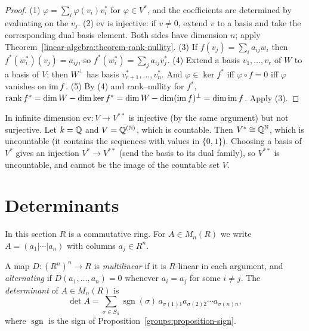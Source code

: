 \begin{proof}
(1) $\varphi = \sum_i \varphi(v_i)v_i^*$ for $\varphi \in V^*$, and the coefficients are determined by evaluating on
the $v_j$.
(2) $\mathrm{ev}$ is injective: if $v \neq 0$, extend $v$ to a basis and take the corresponding dual
basis element. Both sides have dimension $n$; apply
Theorem~\ref{linear-algebra:theorem-rank-nullity}.
(3) If $f(v_j) = \sum_i a_{ij}w_i$ then $f^*(w_i^*)(v_j) = a_{ij}$, so $f^*(w_i^*) = \sum_j a_{ij} v_j^*$.
(4) Extend a basis $v_1, \ldots, v_r$ of $W$ to a basis of $V$; then $W^\perp$ has basis
$v_{r+1}^*, \ldots, v_n^*$. And $\varphi \in \ker f^*$ iff $\varphi \circ f = 0$ iff $\varphi$ vanishes on $\operatorname{im} f$.
(5) By (4) and rank--nullity for $f^*$,
$\operatorname{rank} f^* = \dim W - \dim \ker f^* = \dim W - \dim(\operatorname{im} f)^\perp = \dim \operatorname{im} f$. Apply (3).
\end{proof}

\begin{counterexample}\label{linear-algebra:counterexample-double-dual}
In infinite dimension $\mathrm{ev} \colon V \to V^{**}$ is injective (by the same argument) but not
surjective. Let $k = \mathbb{Q}$ and $V = \mathbb{Q}^{(\mathbb{N})}$, which is countable. Then $V^* \cong \mathbb{Q}^{\mathbb{N}}$, which is
uncountable (it contains the sequences with values in $\{0, 1\}$). Choosing a basis of $V^*$ gives
an injection $V^* \to V^{**}$ (send the basis to its dual family), so $V^{**}$ is uncountable, and
cannot be the image of the countable set $V$.
\end{counterexample}

\section{Determinants}\label{linear-algebra:section-determinants}

In this section $R$ is a commutative ring. For $A \in M_n(R)$ we write $A = (a_1 | \cdots | a_n)$ with
columns $a_j \in R^n$.

\begin{definition}\label{linear-algebra:definition-alternating}
A map $D \colon (R^n)^n \to R$ is \emph{multilinear} if it is $R$-linear in each argument, and
\emph{alternating} if $D(a_1, \ldots, a_n) = 0$ whenever $a_i = a_j$ for some $i \neq j$. The
\emph{determinant} of $A \in M_n(R)$ is
\[
\det A = \sum_{\sigma \in S_n} \operatorname{sgn}(\sigma)\, a_{\sigma(1)1} a_{\sigma(2)2} \cdots a_{\sigma(n)n},
\]
where $\operatorname{sgn}$ is the sign of Proposition~\ref{groups:proposition-sign}.
\end{definition}


